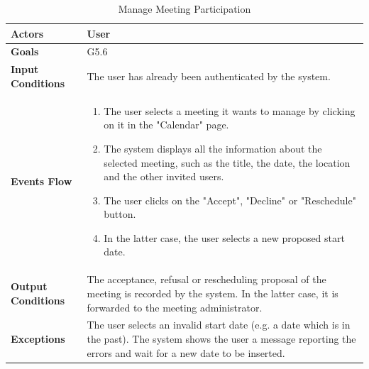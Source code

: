 \begin{table}[H]
	\centering
	\def\arraystretch{1.5}
	\begin{tabular}{|p{7cm}|p{7cm}|}
		\hline
		\textbf{Actors}            & User		    \\ \hline
		\textbf{Goals}             & G5.6           \\ \hline
		\textbf{Input Conditions}  & The user has already been authenticated by the system.           \\ \hline
		\textbf{Events Flow}       & 
			\begin{enumerate}[topsep=0pt, leftmargin=*]
				\item The user selects a meeting it wants to manage by clicking on it in the "Calendar" page.
				\item The system displays all the information about the selected meeting, such as the title, the date, the location and the other invited users.
				\item The user clicks on the "Accept", "Decline" or "Reschedule" button.
				\item In the latter case, the user selects a new proposed start date.
			\end{enumerate}           \\ \hline
		\textbf{Output Conditions} & The acceptance, refusal or rescheduling proposal of the meeting is recorded by the system. In the latter case, it is forwarded to the meeting administrator.           \\ \hline
		\textbf{Exceptions}        & The user selects an invalid start date (e.g. a date which is in the past). The system shows the user a message reporting the errors and wait for a new date to be inserted.           \\ \hline
	\end{tabular}
	\caption{Manage Meeting Participation}
\end{table}


